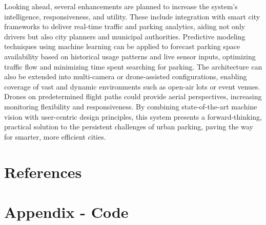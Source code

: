 \documentclass[conference]{IEEEtran}
\begin{document}
Looking ahead, 
several enhancements are planned to increase the system's intelligence, 
responsiveness, 
and utility. 
These include integration with smart city frameworks to deliver real-time traffic and parking analytics, 
aiding not only drivers but also city planners and municipal authorities. 
Predictive modeling techniques using machine learning can be applied to forecast parking space availability based on historical usage patterns and live sensor inputs, 
optimizing traffic flow and minimizing time spent searching for parking. 
The architecture can also be extended into multi-camera or drone-assisted configurations, 
enabling coverage of vast and dynamic environments such as open-air lots or event venues. 
Drones on predetermined flight paths could provide aerial perspectives, 
increasing monitoring flexibility and responsiveness. 
By combining state-of-the-art machine vision with user-centric design principles, 
this system presents a forward-thinking, 
practical solution to the persistent challenges of urban parking, 
paving the way for smarter, more efficient cities.

\section{References}

\printbibliography

\newpage

\onecolumn

\section{Appendix - Code}

\inputminted{python}{inference_export.py}
\end{document}
